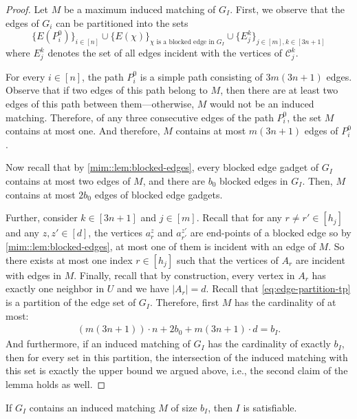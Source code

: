 \documentclass[a4paper,UKenglish,cleveref, autoref, thm-restate]{lipics-v2021}
\begin{document}
\begin{proof}
    Let $M$ be a maximum induced matching of $G_I$. 
    First, we observe that the edges of $G_i$ can be partitioned into the sets
    \begin{equation}\label{eq:edge-partition-tp}
        \{E(P^0_i)\}_{i\in[n]} \cup \{E(\chi)\}_{\chi \text{ is a blocked edge in } G_I} \cup \{E_j^k\}_{j\in[m],k\in[3n+1]}
    \end{equation}
    where 
    $E_j^k$ denotes the set of all edges incident with the vertices of $\mathscr{C}_j^k$.
    
    For every $i\in[n]$, the path $P_i^0$ is a simple path consisting of $3m(3n+1)$ edges. 
    Observe that if two edges of this path belong to $M$, then there are at least two edges of this path between them---otherwise, $M$ would not be an induced matching.
    Therefore, of any three consecutive edges of the path $P_i^0$, the set $M$ contains at most one.
    And therefore, $M$ contains at most $m(3n+1)$ edges of $P_i^0$.
    
    Now recall that by \cref{mim::lem:blocked-edges}, every blocked edge gadget of $G_I$ contains at most two edges of $M$, and there are $b_0$ blocked edges in $G_I$.
    Then, $M$ contains at most $2b_0$ edges of blocked edge gadgets.
    

    Further, consider $k \in [3n+1]$ and $j \in [m]$. 
    Recall that for any $r \neq r' \in [h_j]$ and any $z, z' \in [d]$, the vertices $a_r^z$ and $a_{r'}^{z'}$ are end-points of a blocked edge so by \cref{mim::lem:blocked-edges}, at most one of them is incident with an edge of $M$.
    So there exists at most one index $r \in [h_j]$ such that the vertices of $A_r$ are incident with edges in $M$.
    Finally, recall that by construction, every vertex in $A_r$ has exactly one neighbor in $U$ and we have $|A_r| = d$. 
    Recall that \eqref{eq:edge-partition-tp} is a partition of the edge set of $G_I$. 
    Therefore, first $M$ has the cardinality of at most:
    \begin{align*}
        (m(3n+1)) \cdot n + 2 b_0 + m(3n+1) \cdot d = b_I.
    \end{align*}
    And furthermore, if an induced matching of $G_I$ has the cardinality of exactly $b_I$, then for every set in this partition, the intersection of the induced matching with this set is exactly the upper bound we argued above, i.e., the second claim of the lemma holds as well. 
\end{proof}

\begin{lemma}\label{mim::lem:sol-to-sat}
    If $G_I$ contains an induced matching $M$ of size $b_I$, then $I$ is satisfiable.
\end{lemma}
\end{document}
